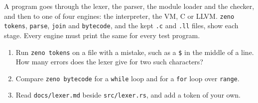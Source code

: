 \begin{summary}
A program goes through the lexer, the parser, the module loader and
the checker, and then to one of four engines: the interpreter, the VM,
C or LLVM. \verb|zeno tokens|, \verb|parse|, \verb|join| and
\verb|bytecode|, and the kept \verb|.c| and \verb|.ll| files, show each
stage. Every engine must print the same for every test program.
\end{summary}

\begin{tryit}
\begin{enumerate}
\item Run \verb|zeno tokens| on a file with a mistake, such as a
  \verb|$| in the middle of a line. How many errors does the lexer give
  for two such characters?
\item Compare \verb|zeno bytecode| for a \verb|while| loop and for a
  \verb|for| loop over \verb|range|.
\item Read \verb|docs/lexer.md| beside \verb|src/lexer.rs|, and add a
  token of your own.
\end{enumerate}
\end{tryit}
